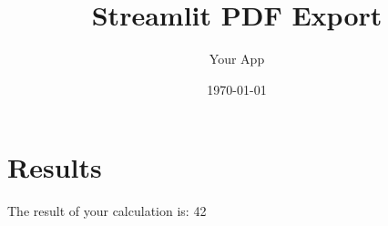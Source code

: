 \documentclass{article}%
\title{Streamlit PDF Export}%
\author{Your App}%
\date{\today}%
\begin{document}
%
\normalsize%
\maketitle%
\section{Results}%
\label{sec:Results}%
The result of your calculation is: 42

%
\end{document}
